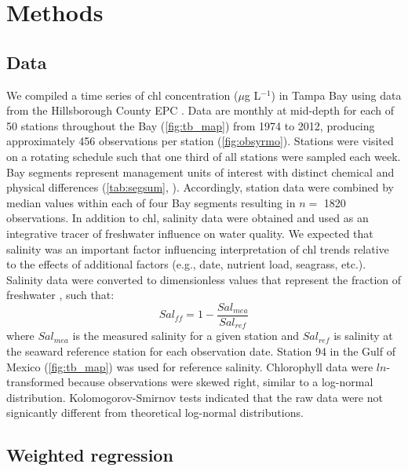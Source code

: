 \documentclass{svjour3}\usepackage[]{graphicx}\usepackage[]{color}
\newcommand{\mugl}{$\mu$g L$^{-1}$}
\begin{document}
\section{Methods}

\subsection{Data}

We compiled a time series of \ac{chl} concentration (\mugl) in Tampa Bay using data from the Hillsborough County \ac{EPC} \cite{TBEP11}.  Data are monthly at mid-depth for each of 50 stations throughout the Bay (\cref{fig:tb_map}) from 1974 to 2012, producing approximately 456 observations per station (\cref{fig:obsyrmo}).  Stations were visited on a rotating schedule such that one third of all stations were sampled each week.  Bay segments represent management units of interest with distinct chemical and physical differences (\cref{tab:segsum}, \cite{Lewis85}).  Accordingly, station data were combined by median values within each of four Bay segments resulting in $n=$ 1820 observations.  In addition to \ac{chl}, salinity data were obtained and used as an integrative tracer of freshwater influence on water quality.  We expected that salinity was an important factor influencing interpretation of \ac{chl} trends relative to the effects of additional factors (e.g., date, nutrient load, seagrass, etc.).  Salinity data were converted to dimensionless values that represent the fraction of freshwater \cite{Dyer73}, such that:
\begin{equation}
Sal_{ff} = 1 - \frac{Sal_{mea}}{Sal_{ref}}
\end{equation}
\noindent where $Sal_{mea}$ is the measured salinity for a given station and $Sal_{ref}$ is salinity at the seaward reference station for each observation date.  Station 94 in the Gulf of Mexico (\cref{fig:tb_map}) was used for reference salinity.  Chlorophyll data were $ln$-transformed because observations were skewed right, similar to a log-normal distribution.  Kolomogorov-Smirnov tests indicated that the raw data were not signicantly different from theoretical log-normal distributions.

\subsection{Weighted regression}
\end{document}
